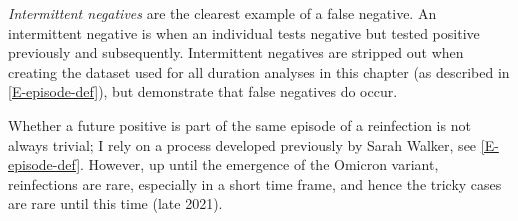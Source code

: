 \documentclass[thesis.tex]{subfiles}
\begin{document}
\emph{Intermittent negatives} are the clearest example of a false negative.
An intermittent negative is when an individual tests negative but tested positive previously and subsequently.
Intermittent negatives are stripped out when creating the dataset used for all duration analyses in this chapter (as described in \cref{E-episode-def}), but demonstrate that false negatives do occur.

Whether a future positive is part of the same episode of a reinfection is not always trivial; I rely on a process developed previously by Sarah Walker, see \cref{E-episode-def}.
However, up until the emergence of the Omicron variant, reinfections are rare, especially in a short time frame, and hence the tricky cases are rare until this time (late 2021).


\ifSubfilesClassLoaded{
  \listoftodos
}{}
\end{document}
